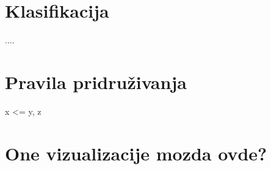 \documentclass[a4paper]{article}
\theoremstyle{definition}
\begin{document}
\section{Klasifikacija}
\label{sec:klasifikacija}
....
\section{Pravila pridruživanja}
\label{sec:pravila}

x <= {y, z}

\section{One vizualizacije mozda ovde?}
\label{sec:dod}
\end{document}
